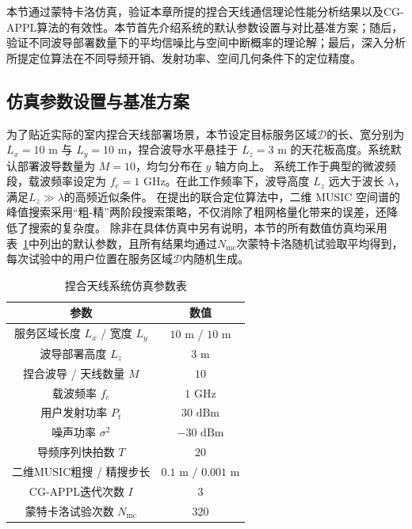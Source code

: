 本节通过蒙特卡洛仿真，验证本章所提的捏合天线通信理论性能分析结果以及CG-APPL算法的有效性。本节首先介绍系统的默认参数设置与对比基准方案；随后，验证不同波导部署数量下的平均信噪比与空间中断概率的理论解；最后，深入分析所提定位算法在不同导频开销、发射功率、空间几何条件下的定位精度。


\subsection{仿真参数设置与基准方案}

为了贴近实际的室内捏合天线部署场景，本节设定目标服务区域$\mathcal{D}$的长、宽分别为 $L_x = 10 \text{ m}$ 与 $L_y = 10 \text{ m}$，捏合波导水平悬挂于 $L_z = 3 \text{ m}$ 的天花板高度。系统默认部署波导数量为 $M = 10$，均匀分布在 $y$ 轴方向上。
系统工作于典型的微波频段，载波频率设定为 $f_c = 1 \text{ GHz}$。在此工作频率下，波导高度 $L_z$ 远大于波长 $\lambda$，满足$L_z \gg \lambda$的高频近似条件。
在提出的联合定位算法中，二维 MUSIC 空间谱的峰值搜索采用“粗-精”两阶段搜索策略，不仅消除了粗网格量化带来的误差，还降低了搜索的复杂度。
除非在具体仿真中另有说明，本节的所有数值仿真均采用表~\ref{tab:pass_sim_params}中列出的默认参数，且所有结果均通过$N_{\mathrm{mc}}$次蒙特卡洛随机试验取平均得到，每次试验中的用户位置在服务区域$\mathcal{D}$内随机生成。

\begin{table}[!htbp]
	\centering
	\caption{捏合天线系统仿真参数表}
	\label{tab:pass_sim_params}
	\begin{tabular}{cc}
		\toprule
		\textbf{参数} & \textbf{数值} \\
		\midrule
		服务区域长度 $L_x$ / 宽度 $L_y$ & $10 \text{ m}$ / $10 \text{ m}$ \\
		波导部署高度 $L_z$ & $3 \text{ m}$ \\
		捏合波导 / 天线数量 $M$ & $10$ \\
		载波频率 $f_c$ & $1 \text{ GHz}$ \\
		用户发射功率 $P_t$ & $30 \text{ dBm}$ \\
		噪声功率 $\sigma^2$ & $-30 \text{ dBm}$ \\
		导频序列快拍数 $T$ & $20$ \\
		二维MUSIC粗搜 / 精搜步长 & $0.1 \text{ m}$ / $0.001 \text{ m}$ \\
		CG-APPL迭代次数 $I$ & $3$ \\
		蒙特卡洛试验次数 $N_{\mathrm{mc}}$ & $320$ \\
		\bottomrule
	\end{tabular}
\end{table}

